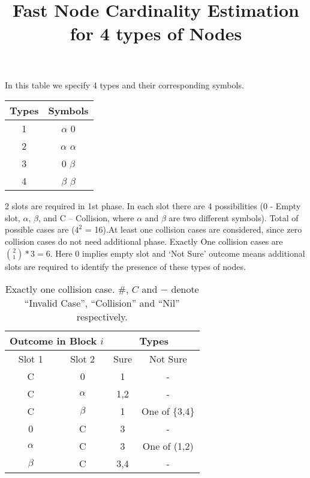 \documentclass[fleqn]{article}
\begin{document}
\title{Fast Node Cardinality Estimation for 4 types of Nodes}

\maketitle{}

In this table we specify 4 types and their corresponding symbols. 
\begin{center}
  \begin{tabular}{| c | c |}
    \hline
    Types & Symbols \\ \hline
    1 & $\alpha$ $0$ \\ \hline
    2 & $\alpha$ $\alpha$ \\ \hline
    3 & $0$ $\beta$ \\ \hline
    4 & $\beta$ $\beta$ \\ \hline
    
  \end{tabular}
\end{center}

2 slots are required in 1st phase. In each slot there are 4 possibilities (0 - Empty slot, $\alpha$, $\beta$, and C – Collision, where $\alpha$ and $\beta$ are two different symbols). Total of possible cases are ($4^2$ = 16).At least one collision cases are considered, since zero collision cases do not need
additional phase.
Exactly One collision cases are $\binom{2}{1}*3 = 6$. 
Here 0 implies empty slot and `Not Sure' outcome means additional slots are
required to identify the presence of these types of nodes.

\begin {table} [h]
\centering
\begin{tabular}{|c|c|c|c|} 
\hline
\multicolumn{2}{|c|}{Outcome in Block $i$} & \multicolumn{2}{c|}{Types} \\ \hline
Slot 1               & Slot 2              & Sure    & Not Sure         \\ \hline
C                    & 0                   & 1        & -                \\ \hline
C                    & $\alpha$            & 1,2     & -                \\ \hline
C                    & $\beta$             & 1       & One of \{3,4\}   \\ \hline
0                    & C                   & 3       & -                \\ \hline
$\alpha$             & C                   & 3       & One of (1,2)     \\ \hline
$\beta$              & C                   & 3,4     & -                \\ \hline
\end{tabular}
\caption{Exactly one collision case. \#, $C$ and $-$ denote ``Invalid Case'', ``Collision'' and  ``Nil'' respectively.}
\label{Tab_OneC1}
\end{table}
\end{document}
